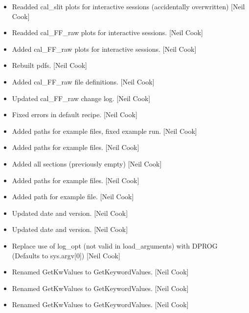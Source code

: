 \documentclass[a4paper,10pt,english]{report}
\begin{document}
\begin{itemize}
\item {} 
Readded cal\_slit plots for interactive sessions (accidentally
overwritten) {[}Neil Cook{]}

\item {} 
Readded cal\_FF\_raw plots for interactive sessions. {[}Neil Cook{]}

\item {} 
Added cal\_FF\_raw plots for interactive sessions. {[}Neil Cook{]}

\item {} 
Rebuilt pdfs. {[}Neil Cook{]}

\item {} 
Added cal\_FF\_raw file definitions. {[}Neil Cook{]}

\item {} 
Updated cal\_FF\_raw change log. {[}Neil Cook{]}

\item {} 
Fixed errors in default recipe. {[}Neil Cook{]}

\item {} 
Added paths for example files, fixed example run. {[}Neil Cook{]}

\item {} 
Added paths for example files. {[}Neil Cook{]}

\item {} 
Added all sections (previously empty) {[}Neil Cook{]}

\item {} 
Added paths for example files. {[}Neil Cook{]}

\item {} 
Added path for example file. {[}Neil Cook{]}

\item {} 
Updated date and version. {[}Neil Cook{]}

\item {} 
Updated date and version. {[}Neil Cook{]}

\item {} 
Replace use of log\_opt (not valid in load\_arguments) with DPROG
(Defaults to sys.argv{[}0{]}) {[}Neil Cook{]}

\item {} 
Renamed GetKwValues to GetKeywordValues. {[}Neil Cook{]}

\item {} 
Renamed GetKwValues to GetKeywordValues. {[}Neil Cook{]}

\item {} 
Renamed GetKwValues to GetKeywordValues. {[}Neil Cook{]}


\end{itemize}
\end{document}
